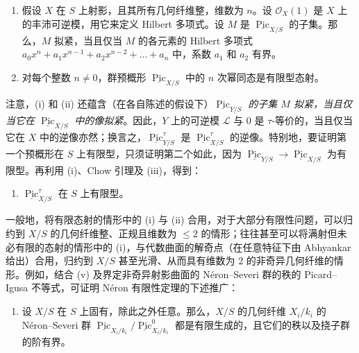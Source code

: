 \begin{remark}{}
\begin{enumerate}
      
 \item[iii.]假设 \(X\) 在 \(S\) 上射影，且其所有几何纤维整，维数为 \(n\)。设 \(\mathcal {O}_X(1)\) 是 \(X\) 上的丰沛可逆模，用它来定义 Hilbert 多项式。设 \(M\) 是 \(\underline {\operatorname {Pic}}_{X/S}\) 的子集。那么，\(M\) 拟紧，当且仅当 \(M\) 的各元素的 Hilbert 多项式 \(a_0x^n+a_1x^{n-1}+a_2x^{n-2}+\ldots +a_n\) 中，系数 \(a_1\) 和 \(a_2\) 有界。


      
 \item[iv.]对每个整数 \(n\neq 0\)，群预概形 \(\underline {\operatorname {Pic}}_{X/S}\) 中的 \(n\) 次幂同态是有限型态射。

    \end{enumerate}\par{}注意，(i) 和 (ii) 还蕴含（在各自陈述的假设下）\emph{\(\underline {\operatorname {Pic}}_{Y/S}\) 的子集 \(M\) 拟紧，当且仅当它在 \(\underline {\operatorname {Pic}}_{X/S}\) 中的像拟紧}。因此，\(Y\) 上的可逆模 \(\mathscr {L}\) 与 \(0\) 是 \(\tau \)-等价的，当且仅当它在 \(X\) 中的逆像亦然；换言之，\(\underline {\operatorname {Pic}}_{Y/S}^\tau \) 是 \(\underline {\operatorname {Pic}}_{X/S}^\tau \) 的逆像。特别地，要证明第一个预概形在 \(S\) 上有限型，只须证明第二个如此，因为 \(\underline {\operatorname {Pic}}_{Y/S}\to \underline {\operatorname {Pic}}_{X/S}\) 为有限型。再利用 (i)、Chow 引理及 (iii)，得到：\begin{enumerate}
      
 \item[v.]\(\underline {\operatorname {Pic}}_{X/S}^\tau \) 在 \(S\) 上有限型。

    \end{enumerate}\par{}一般地，将有限态射的情形中的 (i) 与 (ii) 合用，对于大部分有限性问题，可以归约到 \(X/S\) 的几何纤维整、正规且维数为 \(\leqslant 2\) 的情形；往往甚至可以将满射但未必有限的态射的情形中的 (i)，与代数曲面的解奇点（在任意特征下由 Abhyankar 给出）合用，归约到 \(X/S\) 甚至光滑、从而具有维数为 \(2\) 的非奇异几何纤维的情形。例如，结合 (v) 及界定非奇异射影曲面的 Néron–Severi 群的秩的 Picard–Igusa 不等式，可证明 Néron 有限性定理的下述推广：\begin{enumerate}
      
 \item[vi.]设 \(X/S\) 在 \(S\) 上固有，除此之外任意。那么，\(X/S\) 的几何纤维 \(X_i/k_i\) 的 Néron–Severi 群 \(\underline {\operatorname {Pic}}_{X_i/k_i}/\underline {\operatorname {Pic}}_{X_i/k_i}^0\) 都是有限生成的，且它们的秩以及挠子群的阶有界。


\end{enumerate}
\end{remark}
